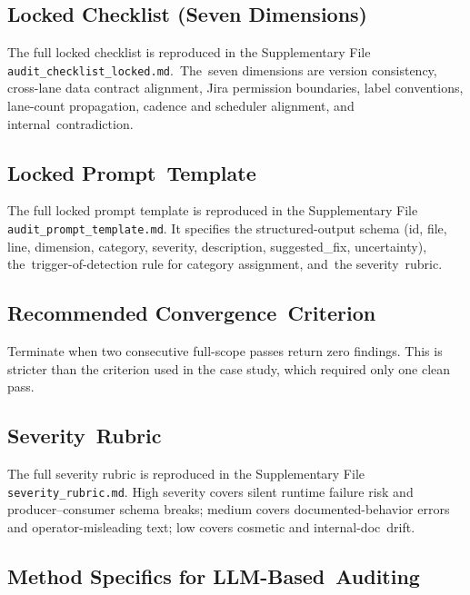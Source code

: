 \documentclass[software,article,accept,pdftex,oneauthor]{Definitions/mdpi}
\begin{document}
\subsection{Locked Checklist (Seven Dimensions)}\label{appendix:a.1}

The full locked checklist is reproduced in the Supplementary File \texttt{audit\_checklist}\linebreak  \texttt{\_locked.md}.~The~seven dimensions are version consistency, cross-lane data contract alignment, Jira permission boundaries, label conventions, lane-count propagation, cadence and scheduler alignment, and internal~contradiction.

\subsection{Locked Prompt~Template}\label{appendix:a.2}

The full locked prompt template is reproduced in the Supplementary File \texttt{audit\_\allowbreak prompt\_\allowbreak template.md}. It specifies the structured-output schema (id, file, line, dimension, category, severity, description, suggested\_fix, uncertainty), the~trigger-of-detection rule for category assignment, and~the severity~rubric.

\subsection{Recommended Convergence~Criterion}\label{appendix:a.3}

Terminate when two consecutive full-scope passes return zero findings. This is stricter than the criterion used in the case study, which required only one clean pass.

\subsection{Severity~Rubric}\label{appendix:a.4}

The full severity rubric is reproduced in the Supplementary File \texttt{severity\_rubric.md}. High severity covers silent runtime failure risk and producer--consumer schema breaks; medium covers documented-behavior errors and operator-misleading text; low covers cosmetic and internal-doc~drift.

\subsection{Method Specifics for LLM-Based~Auditing}\label{appendix:a.5}
\end{document}

